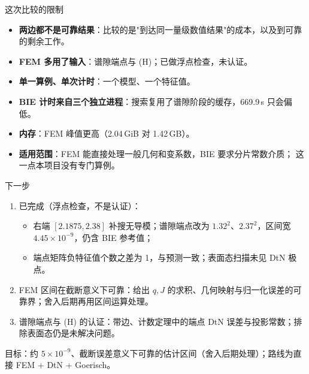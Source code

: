\documentclass[aspectratio=169,11pt,fontset=fandol]{ctexbeamer}
\newcommand{\key}[1]{\begin{keybox}#1\end{keybox}}
\begin{document}
\begin{frame}{这次比较的限制}
  \begin{itemize}
    \item \textbf{两边都不是可靠结果}：比较的是"到达同一量级数值结果"的成本，以及到可靠的剩余工作。
    \item \textbf{FEM 多用了输入}：谱隙端点与 (H)；已做浮点检查，未认证。
    \item \textbf{单一算例、单次计时}：一个模型、一个特征值。
    \item \textbf{BIE 计时来自三个独立进程}：搜索复用了谱隙阶段的缓存，669.9\,s 只会偏低。
    \item \textbf{内存}：FEM 峰值更高（2.04\,GiB 对 1.42\,GB）。
    \item \textbf{适用范围}：FEM 能直接处理一般几何和变系数，BIE 要求分片常数介质；
      这一点本项目没有专门算例。
  \end{itemize}
\end{frame}

\begin{frame}{下一步}
  \begin{enumerate}
    \item 已完成（浮点检查，不是认证）：
      \begin{itemize}
        \item 右端 $[2.1875,2.38]$ 补搜无导模；谱隙端点改为 $1.32^2$、$2.37^2$，区间宽 $4.45\times10^{-9}$，仍含 BIE 参考值；
        \item 端点矩阵负特征值个数之差为 1，与预测一致；表面态扫描未见 DtN 极点。
      \end{itemize}
    \item FEM 区间在截断意义下可靠：给出 $q,J$ 的求积、几何映射与归一化误差的可靠界；舍入后期再用区间运算处理。
    \item 谱隙端点与 (H) 的认证：带边、计数定理中的端点 DtN 误差与投影常数；排除表面态仍是未解决问题。
  \end{enumerate}
  \vspace{0.4em}
  \key{目标：约 $5\times10^{-9}$、截断误差意义下可靠的估计区间（舍入后期处理）；路线为直接 FEM + DtN + Goerisch。}
\end{frame}
\end{document}
